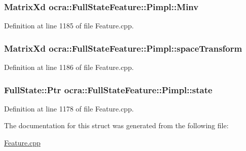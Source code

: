 \subsubsection[{\texorpdfstring{Minv}{Minv}}]{\setlength{\rightskip}{0pt plus 5cm}Matrix\+Xd ocra\+::\+Full\+State\+Feature\+::\+Pimpl\+::\+Minv}\hypertarget{structocra_1_1FullStateFeature_1_1Pimpl_add9febc56f82bdd70913af436e2a32ef}{}\label{structocra_1_1FullStateFeature_1_1Pimpl_add9febc56f82bdd70913af436e2a32ef}


Definition at line 1185 of file Feature.\+cpp.

\subsubsection[{\texorpdfstring{space\+Transform}{spaceTransform}}]{\setlength{\rightskip}{0pt plus 5cm}Matrix\+Xd ocra\+::\+Full\+State\+Feature\+::\+Pimpl\+::space\+Transform}\hypertarget{structocra_1_1FullStateFeature_1_1Pimpl_a365838ffac9d0f8710c86493f04aa084}{}\label{structocra_1_1FullStateFeature_1_1Pimpl_a365838ffac9d0f8710c86493f04aa084}


Definition at line 1186 of file Feature.\+cpp.

\subsubsection[{\texorpdfstring{state}{state}}]{\setlength{\rightskip}{0pt plus 5cm}Full\+State\+::\+Ptr ocra\+::\+Full\+State\+Feature\+::\+Pimpl\+::state}\hypertarget{structocra_1_1FullStateFeature_1_1Pimpl_a4561279776ecf9adda446067000e3536}{}\label{structocra_1_1FullStateFeature_1_1Pimpl_a4561279776ecf9adda446067000e3536}


Definition at line 1178 of file Feature.\+cpp.



The documentation for this struct was generated from the following file\+:\begin{DoxyCompactItemize}
\item 
\hyperlink{Feature_8cpp}{Feature.\+cpp}\end{DoxyCompactItemize}
